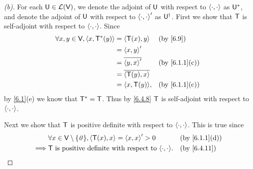 \begin{proof}[(b)]
  For each \(\mathsf{U} \in \mathcal{L}(\mathsf{V})\), we denote the adjoint of \(\mathsf{U}\) with respect to \(\left\langle\cdot, \cdot\right\rangle\) as \(\mathsf{U}^*\), and denote the adjoint of \(\mathsf{U}\) with respect to \(\left\langle\cdot, \cdot\right\rangle'\) as \(\mathsf{U}^{\dag}\).
  First we show that \(\mathsf{T}\) is self-adjoint with respect to \(\left\langle\cdot, \cdot\right\rangle\).
  Since
  \begin{align*}
    \forall x, y \in \V, \inn{x, \T^*(y)} & = \inn{\T(x), y}        &  & \by{6.9}      \\
                                          & = \inn{x, y}'                              \\
                                          & = \conj{\inn{y, x}'}    &  & \by{6.1.1}[c] \\
                                          & = \conj{\inn{\T(y), x}}                    \\
                                          & = \inn{x, \T(y)},       &  & \by{6.1.1}[c]
  \end{align*}
  by \cref{6.1}(e) we know that \(\mathsf{T}^* = \mathsf{T}\).
  Thus by \cref{6.4.8} \(\mathsf{T}\) is self-adjoint with respect to \(\left\langle\cdot, \cdot\right\rangle\).

  Next we show that \(\mathsf{T}\) is positive definite with respect to \(\left\langle\cdot, \cdot\right\rangle\).
  This is true since
  \begin{align*}
             & \forall x \in \V \setminus \set{\zv}, \inn{\T(x), x} = \inn{x, x}' > 0 &  & \by{6.1.1}[d] \\
    \implies & \T \text{ is positive definite with respect to } \inn{\cdot, \cdot}.   &  & \by{6.4.11}
  \end{align*}


\end{proof}

